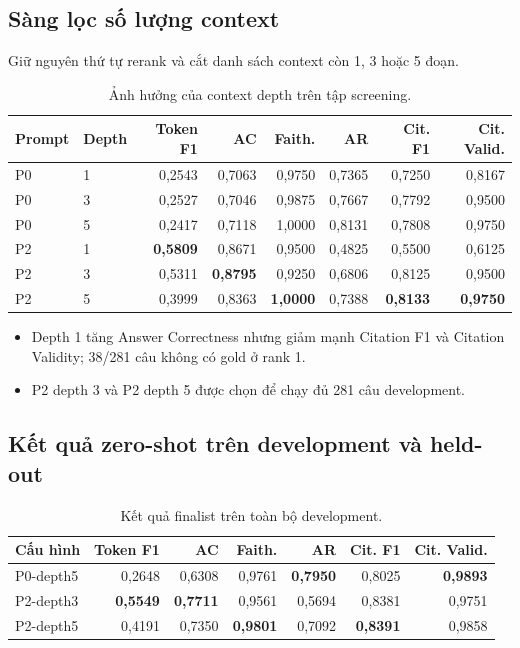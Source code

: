 \subsection{Sàng lọc số lượng context}

Giữ nguyên thứ tự rerank và cắt danh sách context còn 1, 3 hoặc 5 đoạn.

\begin{table}[H]
  \centering
  \caption{Ảnh hưởng của context depth trên tập screening.}
  \label{tab:phase2-depth-screening}
  \small
  \begin{tabular}{llrrrrrr}
    \toprule
    \textbf{Prompt} & \textbf{Depth} & \textbf{Token F1} & \textbf{AC} &
    \textbf{Faith.} & \textbf{AR} & \textbf{Cit. F1} & \textbf{Cit. Valid.} \\
    \midrule
    P0 & 1 & 0,2543 & 0,7063 & 0,9750 & 0,7365 & 0,7250 & 0,8167 \\
    P0 & 3 & 0,2527 & 0,7046 & 0,9875 & 0,7667 & 0,7792 & 0,9500 \\
    P0 & 5 & 0,2417 & 0,7118 & 1,0000 & 0,8131 & 0,7808 & 0,9750 \\
    \midrule
    P2 & 1 & \textbf{0,5809} & 0,8671 & 0,9500 & 0,4825 & 0,5500 & 0,6125 \\
    P2 & 3 & 0,5311 & \textbf{0,8795} & 0,9250 & 0,6806 & 0,8125 & 0,9500 \\
    P2 & 5 & 0,3999 & 0,8363 & \textbf{1,0000} & 0,7388 & \textbf{0,8133} & \textbf{0,9750} \\
    \bottomrule
  \end{tabular}
\end{table}

\begin{itemize}
  \item Depth 1 tăng Answer Correctness nhưng giảm mạnh Citation F1 và
  Citation Validity; 38/281 câu không có gold ở rank 1.
  \item P2 depth 3 và P2 depth 5 được chọn để chạy đủ 281 câu development.
\end{itemize}

\subsection{Kết quả zero-shot trên development và held-out}

\begin{table}[H]
  \centering
  \caption{Kết quả finalist trên toàn bộ development.}
  \label{tab:phase2-zero-shot-finalists}
  \small
  \begin{tabular}{lrrrrrr}
    \toprule
    \textbf{Cấu hình} & \textbf{Token F1} & \textbf{AC} & \textbf{Faith.} &
    \textbf{AR} & \textbf{Cit. F1} & \textbf{Cit. Valid.} \\
    \midrule
    P0-depth5 & 0,2648 & 0,6308 & 0,9761 & \textbf{0,7950} & 0,8025 & \textbf{0,9893} \\
    P2-depth3 & \textbf{0,5549} & \textbf{0,7711} & 0,9561 & 0,5694 & 0,8381 & 0,9751 \\
    P2-depth5 & 0,4191 & 0,7350 & \textbf{0,9801} & 0,7092 & \textbf{0,8391} & 0,9858 \\
    \bottomrule
  \end{tabular}
\end{table}

